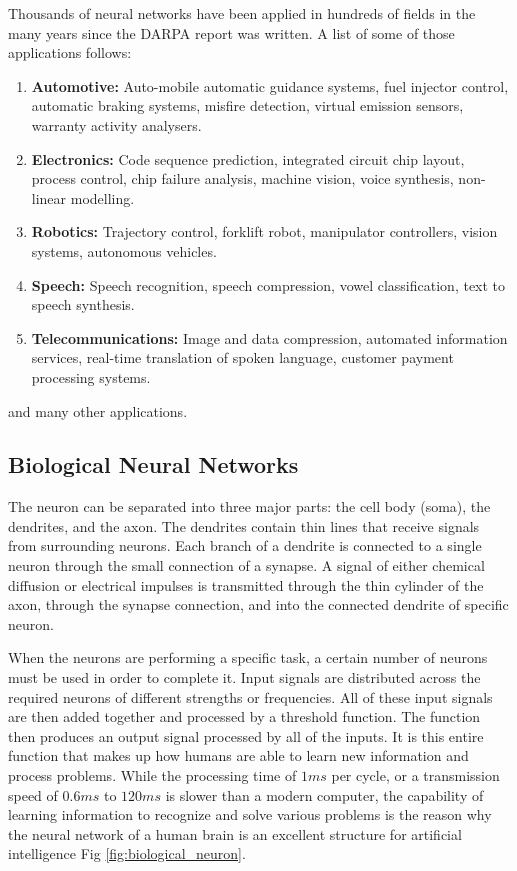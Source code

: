 \documentclass[12pt, a4paper, twoside]{report}
\begin{document}
\par
Thousands of neural networks have been applied in hundreds of fields in the many years since the DARPA report was written. A list of some of those applications follows:
\begin{enumerate}
\item {\bfseries Automotive:} Auto-mobile automatic guidance systems, fuel injector control, automatic braking systems, misfire detection, virtual emission sensors, warranty activity analysers.
\item {\bfseries Electronics:} Code sequence prediction, integrated circuit chip layout, process control, chip failure analysis, machine vision, voice synthesis, non-linear modelling.
\item {\bfseries Robotics:} Trajectory control, forklift robot, manipulator controllers, vision systems, autonomous vehicles.
\item {\bfseries Speech:} Speech recognition, speech compression, vowel classification, text to speech synthesis.
\item {\bfseries Telecommunications:} Image and data compression, automated information services, real-time translation of spoken language, customer payment processing systems.
\end{enumerate}
and many other applications.

\subsection{Biological Neural Networks}
The neuron can be separated into three major parts: the cell body (soma), the dendrites, and the axon. The dendrites contain thin lines that receive signals from surrounding neurons. Each branch of a dendrite is connected to a single neuron through the small connection of a synapse. A signal of either chemical diffusion or electrical impulses is transmitted through the thin cylinder of the axon, through the synapse connection, and into the connected dendrite of specific neuron.
\par
When the neurons are performing a specific task, a certain number of neurons must be used in order to complete it. Input signals are distributed across the required neurons of different strengths or frequencies. All of these input signals are then added together and processed by a threshold function. The function then produces an output signal processed by all of the inputs. It is this entire function that makes up how humans are able to learn new information and process problems. While the processing time of $1ms$ per cycle, or a transmission speed of $0.6ms$ to $120ms$ is slower than a modern computer, the capability of learning information to recognize and solve various problems is the reason why the neural network of a human brain is an excellent structure for artificial intelligence Fig \ref{fig:biological_neuron}.
\end{document}
